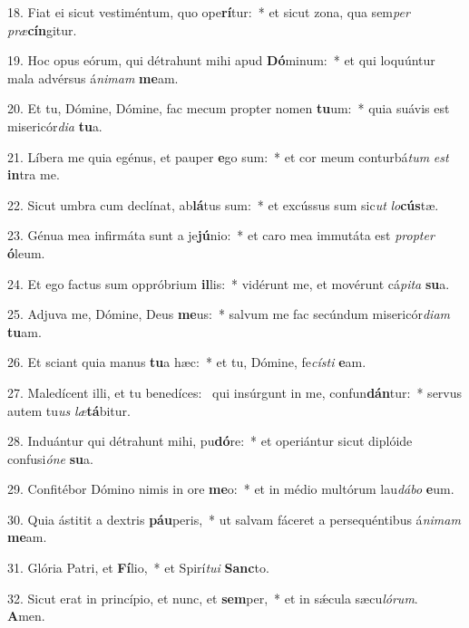 18. Fiat ei sicut vestiméntum, quo ope\textbf{rí}tur:~*  et sicut zona, qua sem\textit{per} \textit{præ}\textbf{cín}gitur.\

19. Hoc opus eórum, qui détrahunt mihi apud \textbf{Dó}minum:~*  et qui loquúntur mala advérsus á\textit{ni}\textit{mam} \textbf{me}am.\

20. Et tu, Dómine, Dómine, fac mecum propter nomen \textbf{tu}um:~*  quia suávis est misericór\textit{di}\textit{a} \textbf{tu}a.\

21. Líbera me quia egénus, et pauper \textbf{e}go sum:~*  et cor meum conturbá\textit{tum} \textit{est} \textbf{in}tra me.\

22. Sicut umbra cum declínat, ab\textbf{lá}tus sum:~*  et excússus sum sic\textit{ut} \textit{lo}\textbf{cús}tæ.\

23. Génua mea infirmáta sunt a je\textbf{jú}nio:~*  et caro mea immutáta est \textit{prop}\textit{ter} \textbf{ó}leum.\

24. Et ego factus sum oppróbrium \textbf{il}lis:~*  vidérunt me, et movérunt cá\textit{pi}\textit{ta} \textbf{su}a.\

25. Adjuva me, Dómine, Deus \textbf{me}us:~*  salvum me fac secúndum misericór\textit{di}\textit{am} \textbf{tu}am.\

26. Et sciant quia manus \textbf{tu}a hæc:~*  et tu, Dómine, fe\textit{cís}\textit{ti} \textbf{e}am.\

27. Maledícent illi, et tu benedíces: \dag\  qui insúrgunt in me, confun\textbf{dán}tur:~*  servus autem tu\textit{us} \textit{læ}\textbf{tá}bitur.\

28. Induántur qui détrahunt mihi, pu\textbf{dó}re:~*  et operiántur sicut diplóide confusi\textit{ó}\textit{ne} \textbf{su}a.\

29. Confitébor Dómino nimis in ore \textbf{me}o:~*  et in médio multórum lau\textit{dá}\textit{bo} \textbf{e}um.\

30. Quia ástitit a dextris \textbf{páu}peris,~*  ut salvam fáceret a persequéntibus á\textit{ni}\textit{mam} \textbf{me}am.\

31. Glória Patri, et \textbf{Fí}lio,~*  et Spirí\textit{tu}\textit{i} \textbf{Sanc}to.\

32. Sicut erat in princípio, et nunc, et \textbf{sem}per,~*  et in sǽcula sæcu\textit{ló}\textit{rum}. \textbf{A}men.\

